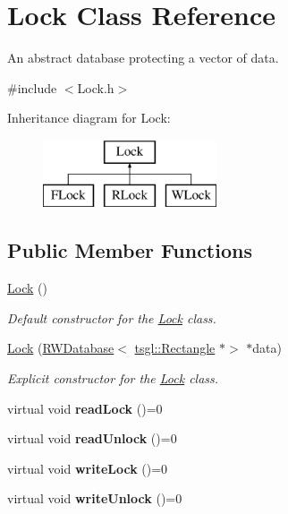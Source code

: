 \hypertarget{class_lock}{}\section{Lock Class Reference}
\label{class_lock}


An abstract database protecting a vector of data.  




{\ttfamily \#include $<$Lock.\+h$>$}

Inheritance diagram for Lock\+:\begin{figure}[H]
\begin{center}
\leavevmode
\includegraphics[height=2.000000cm]{class_lock}
\end{center}
\end{figure}
\subsection*{Public Member Functions}
\begin{DoxyCompactItemize}
\item 
\hyperlink{class_lock_a9944623567d8138b95e74fadc7190adb}{Lock} ()
\begin{DoxyCompactList}\small\item\em Default constructor for the \hyperlink{class_lock}{Lock} class. \end{DoxyCompactList}\item 
\hyperlink{class_lock_a6e5be419fc8b9db7b8c599e805634083}{Lock} (\hyperlink{class_r_w_database}{R\+W\+Database}$<$ \hyperlink{classtsgl_1_1_rectangle}{tsgl\+::\+Rectangle} $\ast$$>$ $\ast$data)
\begin{DoxyCompactList}\small\item\em Explicit constructor for the \hyperlink{class_lock}{Lock} class. \end{DoxyCompactList}\item 
\mbox{\label{class_lock_ac92ae45f564598eefd51798c516f061c}} 
virtual void {\bfseries read\+Lock} ()=0
\item 
\mbox{\label{class_lock_a6b58887c869c252cc4b396ea52770506}} 
virtual void {\bfseries read\+Unlock} ()=0
\item 
\mbox{\label{class_lock_a9c95a05d9c8f1ea00d9242d3a73e8469}} 
virtual void {\bfseries write\+Lock} ()=0
\item 
\mbox{\label{class_lock_a5940100b94c721324740c83669f0b322}} 
virtual void {\bfseries write\+Unlock} ()=0
\end{DoxyCompactItemize}
